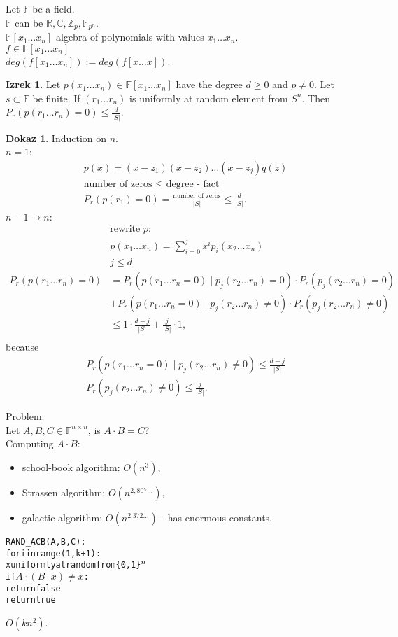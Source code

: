 \documentclass[a4paper, 12pt]{book}
\theoremstyle{definition}
\newtheorem{theorem}[counter]{Izrek}
\newtheorem{pro}[counter]{Dokaz}
\theoremstyle{remark}
\newcommand{\Z}{\mathbb{Z}}
\newcommand{\R}{\mathbb{R}}
\newcommand{\C}{\mathbb{C}}
\newcommand{\F}{\mathbb{F}}
\begin{document}
Let $\F$ be a field. \\
$\F$ can be $\R, \C, \Z_p, \F_{p^n}$. \\
$\F[x_1 \dots x_n]$ algebra of polynomials with values $x_1 \dots x_n$. \\
$f \in \F[x_1 \dots x_n]$ \\
$deg(f[x_1 \dots x_n]) := deg(f[x \dots x])$.
\begin{theorem}
  Let $p(x_1 \dots x_n) \in \F[x_1 \dots x_n]$ have the degree $d \geq 0$ and $p \neq 0$.
  Let $s \subset \F$ be finite.
  If $(r_1 \dots r_n)$ is uniformly at random element from $S^n$.
  Then $P_r(p(r_1 \dots r_n) = 0) \leq \frac{d}{|S|}$.
\end{theorem}
\begin{pro}
  Induction on $n$. \\
  $n=1$:
  \begin{align*}
    &p(x) = (x-z_1) (x-z_2) \dots (x-z_j) q(z) \\
    &\text{number of zeros } \leq \text{ degree - fact} \\
    &P_r(p(r_1) = 0) = \frac{\text{number of zeros}}{|S|} \leq \frac{d}{|S|}.
  \end{align*}
  $n-1 \to n$:
  \begin{align*}
    &\text{rewrite }p: \\
    &p(x_1 \dots x_n) = \sum_{i=0}^{j} x^i p_i(x_2 \dots x_n) \\
    &j \leq d \\
    P_r(p(r_1 \dots r_n) = 0) &= P_r(p(r_1 \dots r_n = 0) \mid p_j(r_2 \dots r_n) = 0) \cdot P_r(p_j(r_2 \dots r_n) = 0) \\
    &+ P_r(p(r_1 \dots r_n = 0) \mid p_j(r_2 \dots r_n) \neq 0) \cdot P_r(p_j(r_2 \dots r_n) \neq 0) \\
    &\leq 1 \cdot \frac{d-j}{|S|} + \frac{j}{|S|} \cdot 1, \\
  \end{align*}
  because
  \begin{align*}
    &P_r(p(r_1 \dots r_n = 0) \mid p_j(r_2 \dots r_n) \neq 0) \leq \frac{d-j}{|S|} \\
    &P_r(p_j(r_2 \dots r_n) \neq 0) \leq \frac{j}{|S|}.
  \end{align*}
\end{pro}
\underline{Problem}: \\
Let $A,B,C \in \F^{n \times n}$, is $A \cdot B = C$? \\
Computing $A \cdot B$:
\begin{itemize}
  \item school-book algorithm: $O\left(n^3\right)$,
  \item Strassen algorithm: $O\left(n^{2,807\dots}\right)$,
  \item galactic algorithm: $O\left(n^{2.372\dots}\right)$ - has enormous constants.
\end{itemize}
\begin{alltt}
  RAND_ACB(A,B,C):
    for i in range(1,k+1):
      x uniformly at random from \{0,1\}\(\sp{n}\)
      if \(A \cdot (B \cdot x) \neq x\):
        return false
    return true
\end{alltt}
$O\left(k n^2\right)$. \\
\end{document}
